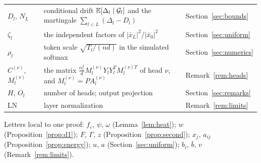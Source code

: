 {\begin{center}
\begin{tabular}{@{}p{}p{}l@{}}
$D_l$, $N_L$ & conditional drift $\mathbb{E}[\Delta_l\mid\mathcal{G}_l]$ and the martingale $\sum_{l<L}(\Delta_l-D_l)$ & Section~\ref{sec:bounds} \\
$\zeta_l$ & the independent factors of $|\bar x_L|^2/|\bar x_0|^2$ & Section~\ref{sec:uniform} \\
$\rho_l$ & token scale $\sqrt{T_l/(nd)}$ in the simulated softmax & Section~\ref{sec:numerics} \\
$C^{(\nu)}$, $M_l^{(\nu)}$ & the matrix $\frac{\alpha_l^2}{d}M_l^{(\nu)}Y_lY_l^{T}M_l^{(\nu)T}$ of head $\nu$, and $M_l^{(\nu)}=PA_l^{(\nu)}$ & Remark~\ref{rem:heads} \\
$H$, $O_l$ & number of heads; output projection & Section~\ref{sec:remarks} \\
$\mathrm{LN}$ & layer normalization & Remark~\ref{rem:limits} \\
\bottomrule
\end{tabular}
\end{center}
}
Letters local to one proof: $f_\varepsilon$, $\psi$, $\omega$ (Lemma~\ref{lem:heat}); $w$ (Proposition~\ref{prop:d1}); $F$, $\Gamma$, $z$ (Proposition~\ref{prop:second}); $x_j$, $a_{ij}$ (Proposition~\ref{prop:energy}); $u$, $a$ (Section~\ref{sec:uniform}); $b_i$, $\bar b$, $v$ (Remark~\ref{rem:limits}).

